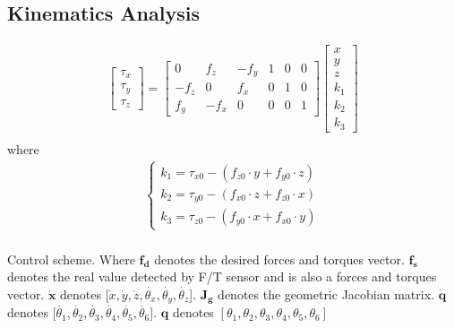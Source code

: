 \documentclass[12pt]{article}
\begin{document}
\begin{CJK}{UTF8}{bsmi}

\section{Kinematics Analysis}
\begin{equation}
\begin{split}
\begin{bmatrix}
\tau _x\\
\tau _y\\
\tau _z
\end{bmatrix}
=
\begin{bmatrix}
0		&f_z	&-f_y	&1	&0	&0\\
-f_z	&0		&f_x	&0	&1	&0\\
f_y		&-f_x	&0		&0	&0	&1
\end{bmatrix}
\begin{bmatrix}
x\\
y\\
z\\
k_1\\
k_2\\
k_3
\end{bmatrix}\\
\end{split}
\end{equation}
where
\begin{equation*}
\begin{split}
\left\{\begin{matrix}
k_1 = \tau _{x0} - \left( f_{z0} \cdot y + f_{y0} \cdot z \right) \\
k_2 = \tau _{y0} - \left( f_{x0} \cdot z + f_{z0} \cdot x \right) \\
k_3 = \tau _{z0} - \left( f_{y0} \cdot x + f_{x0} \cdot y \right) 
\end{matrix}\right.\\
\end{split}
\end{equation*}


Control scheme. Where $\boldsymbol{f_d}$ denotes the desired forces and torques vector. $\boldsymbol{f_s}$ denotes the real value detected by F/T sensor and is also a forces and torques vector. $\boldsymbol{\dot{x}}$ denotes [$\dot{x}, \dot{y}, \dot{z}, \dot{\theta _x}, \dot{\theta _y}, \dot{\theta _z}$]. $\mathbf{J_g}$ denotes the geometric Jacobian matrix. $\boldsymbol{\dot{q}}$ denotes [$\dot{\theta _1}, \dot{\theta _2}, \dot{\theta _3}, \dot{\theta _4}, \dot{\theta _5}, \dot{\theta _6}$]. $\boldsymbol{q}$ denotes $\left[\theta _1, \theta _2, \theta _3, \theta _4, \theta _5, \theta _6 \right] $



\end{CJK}
\end{document}
